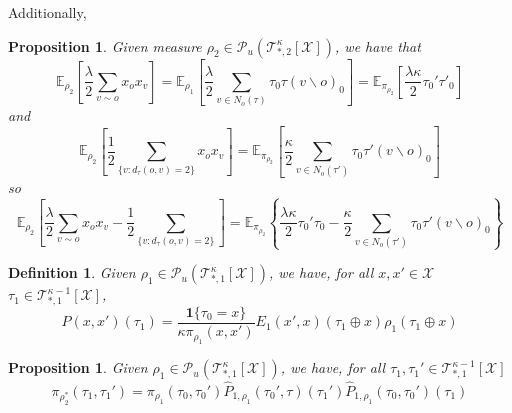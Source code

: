 \documentclass[12pt]{article}
\newtheorem{proposition}[theorem]{Proposition}
\newtheorem{definition}[theorem]{Definition}
\newcommand{\X}{{\mathcal{X}}}
\newcommand{\PP}{{\mathcal{P}}}
\newcommand{\TT}{{\mathcal{T}}}
\newcommand{\one}[1]{\mathbf{1}\{#1\}}
\newcommand{\tree}[2]{\TT_{*, #1}^{#2}[\X]}
\newcommand{\measure}[2]{\PP_u(\TT_{*, #1}^{#2}[\X])}
\numberwithin{equation}{section}
\begin{document}
Additionally,
\begin{proposition}
    Given measure $\rho_2\in\measure{2}{\kappa}$, we have that
    \begin{equation*}
        \mathbb{E}_{\rho_2}\left[\frac\lambda2\sum_{v\sim o} x_o x_v\right] = \mathbb{E}_{\rho_1}\left[\frac\lambda2\sum_{v\in N_o(\tau)} \tau_0\tau(v\backslash o)_0\right] = \mathbb{E}_{\pi_{\rho_2}}\left[\frac{\lambda\kappa}2\tau_0'\tau'_0\right]
    \end{equation*}
    and
    \begin{equation*}
        \mathbb{E}_{\rho_2}\left[\frac12\sum_{\{v:d_\tau(o, v)=2\}} x_o x_v\right] = \mathbb{E}_{\pi_{\rho_2}}\left[\frac\kappa 2\sum_{v\in N_o(\tau')} \tau_0\tau'(v\backslash o)_0\right]
    \end{equation*}
    so
    \begin{equation*}
        \mathbb{E}_{\rho_2}\left[\frac\lambda2\sum_{v\sim o} x_o x_v - \frac12\sum_{\{v:d_\tau(o, v)=2\}}\right] =\mathbb{E}_{\pi_{\rho_2}}
        \left\{\frac{\lambda\kappa}2\tau_0'\tau_0 - \frac\kappa 2\sum_{v\in N_o(\tau')} \tau_0\tau'(v\backslash o)_0\right\}
    \end{equation*}
\end{proposition}

\begin{definition}
    Given $\rho_1 \in \mathcal{P}_u(\tree{1}{\kappa})$, we have, for all $x, x' \in \mathcal{X}$ $\tau_1 \in \tree{1}{\kappa-1}$,
    \begin{equation*}
        \widehat{P}(x, x')(\tau_1) = \frac{\one{\tau_0 = x}}{\kappa \pi_{\rho_1}(x, x')} E_1(x', x)(\tau_1\oplus x) \rho_1(\tau_1\oplus x)
    \end{equation*}
\end{definition}

\begin{proposition}
    Given $\rho_1 \in \mathcal{P}_u(\tree{1}{\kappa})$, we have, for all $\tau_1, \tau_1' \in \tree{1}{\kappa-1}$
    \begin{equation}\label{Eq.NNNI-pi-rho2-star}
        \pi_{\rho_2^*}(\tau_1, \tau_1') = \pi_{\rho_1}(\tau_0, \tau_0')\widehat{P}_{1, \rho_1}(\tau_0', \tau)(\tau_1')\widehat{P}_{1, \rho_1}(\tau_0, \tau_0')(\tau_1)
    \end{equation}
\end{proposition}
\end{document}
